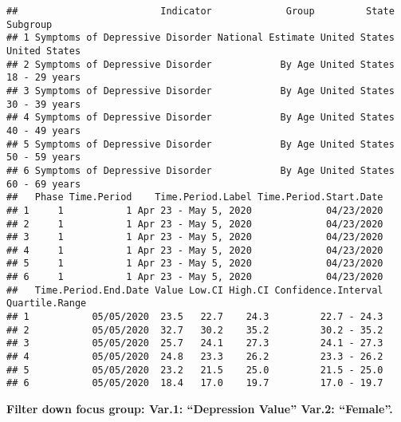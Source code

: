 \documentclass[
]{article}
\newenvironment{Shaded}{\begin{snugshade}}{\end{snugshade}}
\newcommand{\FunctionTok}[1]{\textcolor[rgb]{0.00,0.00,0.00}{#1}}
\newcommand{\NormalTok}[1]{#1}
\newcommand{\OtherTok}[1]{\textcolor[rgb]{0.56,0.35,0.01}{#1}}
\newcommand{\SpecialCharTok}[1]{\textcolor[rgb]{0.00,0.00,0.00}{#1}}
\newcommand{\StringTok}[1]{\textcolor[rgb]{0.31,0.60,0.02}{#1}}
\begin{document}
\begin{verbatim}
##                         Indicator             Group         State      Subgroup
## 1 Symptoms of Depressive Disorder National Estimate United States United States
## 2 Symptoms of Depressive Disorder            By Age United States 18 - 29 years
## 3 Symptoms of Depressive Disorder            By Age United States 30 - 39 years
## 4 Symptoms of Depressive Disorder            By Age United States 40 - 49 years
## 5 Symptoms of Depressive Disorder            By Age United States 50 - 59 years
## 6 Symptoms of Depressive Disorder            By Age United States 60 - 69 years
##   Phase Time.Period    Time.Period.Label Time.Period.Start.Date
## 1     1           1 Apr 23 - May 5, 2020             04/23/2020
## 2     1           1 Apr 23 - May 5, 2020             04/23/2020
## 3     1           1 Apr 23 - May 5, 2020             04/23/2020
## 4     1           1 Apr 23 - May 5, 2020             04/23/2020
## 5     1           1 Apr 23 - May 5, 2020             04/23/2020
## 6     1           1 Apr 23 - May 5, 2020             04/23/2020
##   Time.Period.End.Date Value Low.CI High.CI Confidence.Interval Quartile.Range
## 1           05/05/2020  23.5   22.7    24.3         22.7 - 24.3               
## 2           05/05/2020  32.7   30.2    35.2         30.2 - 35.2               
## 3           05/05/2020  25.7   24.1    27.3         24.1 - 27.3               
## 4           05/05/2020  24.8   23.3    26.2         23.3 - 26.2               
## 5           05/05/2020  23.2   21.5    25.0         21.5 - 25.0               
## 6           05/05/2020  18.4   17.0    19.7         17.0 - 19.7
\end{verbatim}

\textbf{Filter down focus group: Var.1: ``Depression Value'' Var.2:
``Female''.}

\begin{Shaded}
\end{Shaded}
\end{document}
